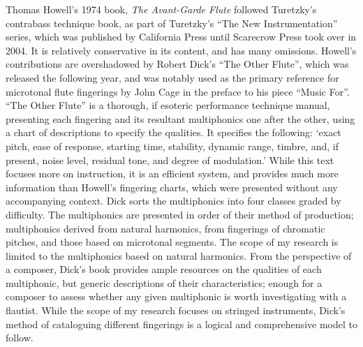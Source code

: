 Thomas Howell’s 1974 book, \textit{The Avant-Garde Flute} followed Turetzky’s contrabass technique book, as part of Turetzky’s “The New Instrumentation” series, which was published by California Press until Scarecrow Press took over in 2004.\autocite[4]{fallowfieldCelloMapHandbook2009} It is relatively conservative in its content, and has many omissions. Howell’s contributions are overshadowed by Robert Dick’s “The Other Flute”, which was released the following year, and was notably used as the primary reference for microtonal flute fingerings by John Cage in the preface to his piece “Music For”.\autocite{cageMusicPartsVoice1984} “The Other Flute” is a thorough, if esoteric performance technique manual, presenting each fingering and its resultant multiphonics one after the other, using a chart of descriptions to specify the qualities. It specifies the following: ‘exact pitch, ease of response, starting time, stability, dynamic range, timbre, and, if present, noise level, residual tone, and degree of modulation.’\autocite[84]{dickOtherFlute1989} While this text focuses more on instruction, it is an efficient system, and provides much more information than Howell’s fingering charts, which were presented without any accompanying context. Dick sorts the multiphonics into four classes graded by difficulty. The multiphonics are presented in order of their method of production; multiphonics derived from natural harmonics, from fingerings of chromatic pitches, and those based on microtonal segments. The scope of my research is limited to the multiphonics based on natural harmonics. From the perspective of a composer, Dick’s book provides ample resources on the qualities of each multiphonic, but generic descriptions of their characteristics; enough for a composer to assess whether any given multiphonic is worth investigating with a flautist. While the scope of my research focuses on stringed instruments, Dick’s method of cataloguing different fingerings is a logical and comprehensive model to follow.

